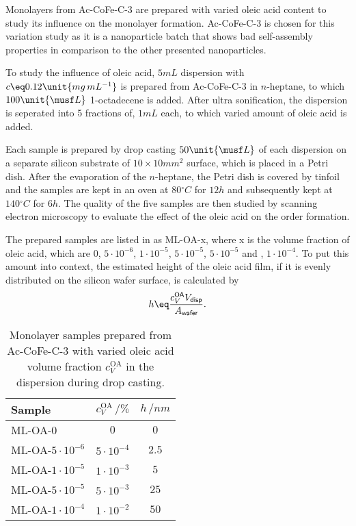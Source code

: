 \documentclass[\main/dresen_thesis.tex]{subfiles}
\begin{document}
      Monolayers from Ac-CoFe-C-3 are prepared with varied oleic acid content to study its influence on the monolayer formation.
      Ac-CoFe-C-3 is chosen for this variation study as it is a nanoparticle batch that shows bad self-assembly properties in comparison to the other presented nanoparticles.

      To study the influence of oleic acid, $5 \unit{mL}$ dispersion with $c \eq 0.12 \unit{mg \, mL^{-1}}$ is prepared from Ac-CoFe-C-3 in $\mathit{n}$-heptane, to which $100 \unit{\musf L}$ 1-octadecene is added.
      After ultra sonification, the dispersion is seperated into 5 fractions of, $1 \unit{mL}$ each, to which varied amount of oleic acid is added.

      Each sample is prepared by drop casting $50 \unit{\musf L}$ of each dispersion on a separate silicon substrate of $10 \times 10 \unit{mm^2}$ surface, which is placed in a Petri dish.
      After the evaporation of the $\mathit{n}$-heptane, the Petri dish is covered by tinfoil and the samples are kept in an oven at $80 \unit{^\circ C}$ for $\unit{12 \unit{h}}$ and subsequently kept at $140 \unit{^\circ C}$ for $\unit{6 \unit{h}}$.
      The quality of the five samples are then studied by scanning electron microscopy to evaluate the effect of the oleic acid on the order formation.

      The prepared samples are listed in  as ML-OA-x, where x is the volume fraction of oleic acid, which are $0$, $5 \cdot 10^{-6}$, $1 \cdot 10^{-5}$, $5 \cdot 10^{-5}$, $5 \cdot 10^{-5}$ and , $1 \cdot 10^{-4}$.
      To put this amount into context, the estimated height of the oleic acid film, if it is evenly distributed on the silicon wafer surface, is calculated by
      \begin{align}
        \label{eq:monolayers:preparation:solventVariation:OAAddend}
        h \eq \frac{c_V^\textsf{OA} V_\textsf{disp}}{A_\textsf{wafer}}.
      \end{align}

      \begin{table}[!htbp]
        \centering
        \caption{\label{tab:monolayers:charMethod:OAVariation}Monolayer samples prepared from Ac-CoFe-C-3 with varied oleic acid volume fraction $c_V^\mathrm{OA}$ in the dispersion during drop casting.}
        \begin{tabular}{ l | c | c}
          \textbf{Sample} & $c_V^\mathrm{OA} \, / \unit{\%}$ & $h \, / \unit{nm}$\\
          \hline
          ML-OA-$0$               & $0$                      & $0$\\
          ML-OA-$5 \cdot 10^{-6}$ & $5 \cdot 10^{-4}$        & $2.5$\\
          ML-OA-$1 \cdot 10^{-5}$ & $1 \cdot 10^{-3}$        & $5$\\
          ML-OA-$5 \cdot 10^{-5}$ & $5 \cdot 10^{-3}$        & $25$\\
          ML-OA-$1 \cdot 10^{-4}$ & $1 \cdot 10^{-2}$        & $50$\\
          \hline
        \end{tabular}
      \end{table}
\end{document}
